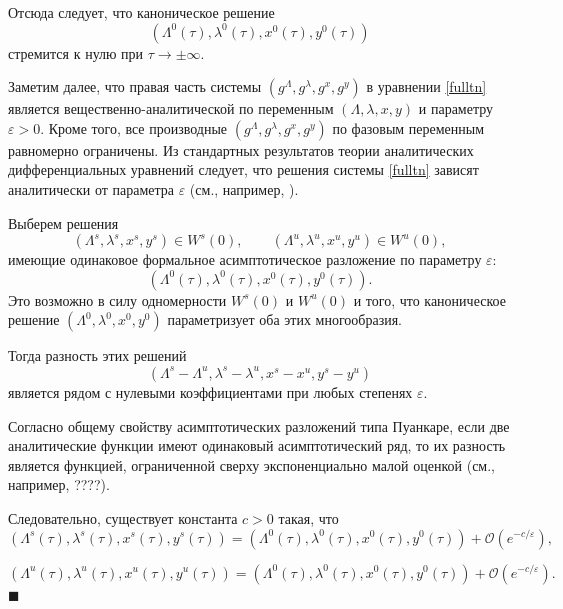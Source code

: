 Отсюда следует, что каноническое решение
\[
(\Lambda^0(\tau),\lambda^0(\tau),x^0(\tau),y^0(\tau))
\]
стремится к нулю при
\(
\tau\to\pm\infty .
\)

Заметим далее, что правая часть системы
\((g^\Lambda,g^\lambda,g^x,g^y)\)
в уравнении \eqref{fulltn}
является вещественно-аналитической по переменным
\((\Lambda,\lambda,x,y)\)
и параметру
\(\varepsilon>0\).
Кроме того, все производные
\((g^\Lambda,g^\lambda,g^x,g^y)\)
по фазовым переменным равномерно ограничены.
Из стандартных результатов теории аналитических
дифференциальных уравнений следует, что решения системы
\eqref{fulltn}
зависят аналитически от параметра
\(\varepsilon\)
(см., например,
\cite{ArnoldODE}).

Выберем решения
$$
(\Lambda^s,\lambda^s,x^s,y^s)\in W^s(0),
\qquad
(\Lambda^u,\lambda^u,x^u,y^u)\in W^u(0),
$$
имеющие одинаковое формальное асимптотическое
разложение по параметру \(\varepsilon\):
$$
(\Lambda^0(\tau),\lambda^0(\tau),x^0(\tau),y^0(\tau)).
$$
Это возможно в силу одномерности $W^s(0)$ и $W^u(0)$ и того, что каноническое решение $(\Lambda^0,\lambda^0,x^0,y^0)$ параметризует оба этих многообразия.

Тогда разность этих решений
$$
(\Lambda^s-\Lambda^u,
\lambda^s-\lambda^u,
x^s-x^u,
y^s-y^u)
$$
является рядом с нулевыми коэффициентами при любых степенях $\varepsilon$.

Согласно общему свойству асимптотических разложений
типа Пуанкаре,
если две аналитические функции имеют одинаковый
асимптотический ряд, то их разность является
функцией, ограниченной сверху экспоненциально малой оценкой
(см., например,
????\cite{??}).

Следовательно, существует константа \(c>0\) такая, что
$$
(\Lambda^s(\tau),\lambda^s(\tau),x^s(\tau),y^s(\tau))
=
(\Lambda^0(\tau),\lambda^0(\tau),x^0(\tau),y^0(\tau))
+
\mathcal{O}\!\left(e^{-c/\varepsilon}\right),
$$

$$
(\Lambda^u(\tau),\lambda^u(\tau),x^u(\tau),y^u(\tau))
=
(\Lambda^0(\tau),\lambda^0(\tau),x^0(\tau),y^0(\tau))
+
\mathcal{O}\!\left(e^{-c/\varepsilon}\right).
$$
$\blacksquare$

